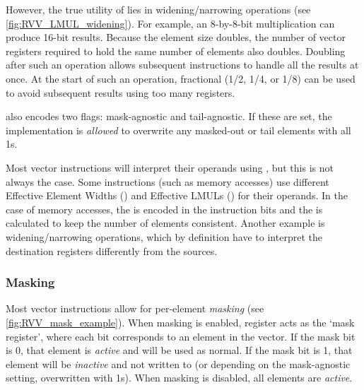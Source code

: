 
However, the true utility of  lies in widening/narrowing operations (see \cref{fig:RVV_LMUL_widening}).
For example, an 8-by-8-bit multiplication can produce 16-bit results.
Because the element size doubles, the number of vector registers required to hold the same number of elements also doubles.
Doubling  after such an operation allows subsequent instructions to handle all the results at once.
At the start of such an operation, fractional  (1/2, 1/4, or 1/8) can be used to avoid subsequent results using too many registers.

 also encodes two flags: mask-agnostic and tail-agnostic.
If these are set, the implementation is \emph{allowed} to overwrite any masked-out or tail elements with all 1s.

Most vector instructions will interpret their operands using , but this is not always the case.
Some instructions (such as memory accesses) use different Effective Element Widths () and Effective LMULs () for their operands.
In the case of memory accesses, the  is encoded in the instruction bits and the  is calculated to keep the number of elements consistent.
Another example is widening/narrowing operations, which by definition have to interpret the destination registers differently from the sources.

\pagebreak
{}
\subsubsection{Masking}\label{chap:bg:sec:rvv:masking}
Most vector instructions allow for per-element \emph{masking} (see \cref{fig:RVV_mask_example}).
When masking is enabled, register  acts as the `mask register', where each bit corresponds to an element in the vector.
If the mask bit is 0, that element is \emph{active} and will be used as normal.
If the mask bit is 1, that element will be \emph{inactive} and not written to (or depending on the mask-agnostic setting, overwritten with 1s).
When masking is disabled, all elements are \emph{active}.


